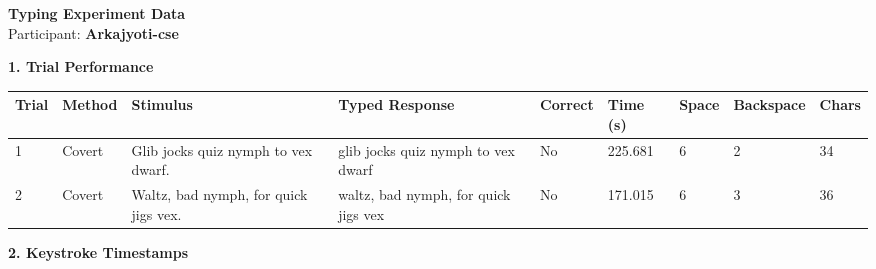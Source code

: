 \documentclass[10pt,a4paper]{article}
\begin{document}

\begin{center}
    {\Large\bfseries Typing Experiment Data}\\
    \vspace{2pt}
    Participant: \textbf{Arkajyoti-cse}
\end{center}

\vspace{0.25cm}


\noindent
{\large\bfseries 1. Trial Performance}

\vspace{0.08cm}

\begin{center}
\begin{tabularx}{\textwidth}{
    C{0.45in}
    C{0.65in}
    L{2.35in}
    L{2.55in}
    C{0.65in}
    C{0.65in}
    C{0.55in}
    C{0.75in}
    C{0.55in}
}
\toprule

\textbf{Trial} &
\textbf{Method} &
\textbf{Stimulus} &
\textbf{Typed Response} &
\textbf{Correct} &
\textbf{Time (s)} &
\textbf{Space} &
\textbf{Backspace} &
\textbf{Chars}
\\

\midrule

1 &
Covert &
Glib jocks quiz nymph to vex dwarf. &
glib jocks quiz nymph to vex dwarf &
No &
225.681 &
6 &
2 &
34
\\

2 &
Covert &
Waltz, bad nymph, for quick jigs vex. &
waltz, bad nymph, for quick jigs vex &
No &
171.015 &
6 &
3 &
36
\\

\bottomrule
\end{tabularx}
\end{center}

\vspace{0.35cm}


\noindent
{\large\bfseries 2. Keystroke Timestamps}

\vspace{0.08cm}
\end{document}
